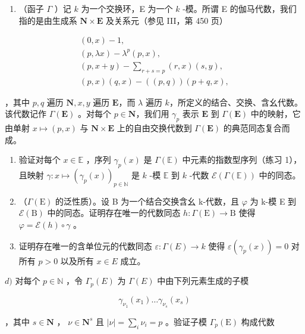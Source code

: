\begin{enumerate}
\def\labelenumi{\arabic{enumi})}
\setcounter{enumi}{1}
\tightlist
\item
  （函子 \(\Gamma\) ）记 \(k\) 为一个交换环，E 为一个 \(k\) -模。所谓 E 的伽马代数，我们指的是由生成系 \(\mathbf{N} \times \mathbf{E}\) 及关系元（参见 III，第 450 页）
\end{enumerate}

\[
\begin{array}{c} (0, x) - 1, \\ (p, \lambda x) - \lambda^ {p} (p, x), \\ (p, x + y) - \sum_ {r + s = p} (r, x) (s, y), \\ (p, x) (q, x) - ((p, q)) (p + q, x), \end{array}
\]

，其中 \(p, q\) 遍历 \(\mathbf{N}, x, y\) 遍历 \(\mathbf{E}\)，而 \(\lambda\) 遍历 \(k\)，所定义的结合、交换、含幺代数。该代数记作 \(\Gamma(\mathbf{E})\) 。对每个 \(p \in \mathbf{N}\)，我们用 \(\gamma_p\) 表示 \(\mathbf{E}\) 到 \(\Gamma(\mathbf{E})\) 中的映射，它由单射 \(x \mapsto (p, x)\) 与 \(\mathbf{N} \times \mathbf{E}\) 上的自由交换代数到 \(\Gamma(\mathbf{E})\) 的典范同态复合而成。

\begin{enumerate}
\def\labelenumi{\alph{enumi})}
\item
  验证对每个 \(x \in \mathbb{E}\) ，序列 \(\gamma_p(x)\) 是 \(\Gamma(\mathbb{E})\) 中元素的指数型序列（练习 1），且映射 \(\gamma : x \mapsto (\gamma_p(x))_{p \in \mathbb{N}}\) 是 \(k\) -模 \(\mathbb{E}\) 到 \(k\) -代数 \(\mathcal{E}(\Gamma(\mathbb{E}))\) 中的同态。
\item
  （\(\Gamma(\mathrm{E})\) 的泛性质）。设 B 为一个结合交换含幺 k-代数，且 \(\varphi\) 为 k-模 E 到 \(\mathcal{E}(\mathrm{B})\) 中的同态。证明存在唯一的代数同态 \(h: \Gamma(\mathrm{E}) \to \mathrm{B}\) 使得 \(\varphi = \mathcal{E}(h) \circ \gamma\) 。
\item
  证明存在唯一的含单位元的代数同态 \(\varepsilon : \Gamma(E) \to k\) 使得 \(\varepsilon(\gamma_p(x)) = 0\) 对所有 \(p > 0\) 以及所有 \(x \in E\) 成立。
\end{enumerate}

\(d)\) 对每个 \(p \in \mathbb{N}\) ，令 \(\Gamma_p(E)\) 为 \(\Gamma(E)\) 中由下列元素生成的子模

\[
\gamma_ {\nu_ {1}} (x _ {1}) \dots \gamma_ {\nu_ {s}} (x _ {s})
\]

，其中 \(s \in \mathbf{N}\) ， \(\nu \in \mathbf{N}^s\) 且 \(|\nu| = \sum_{i} \nu_i = p\) 。验证子模 \(\Gamma_p(\mathrm{E})\) 构成代数

